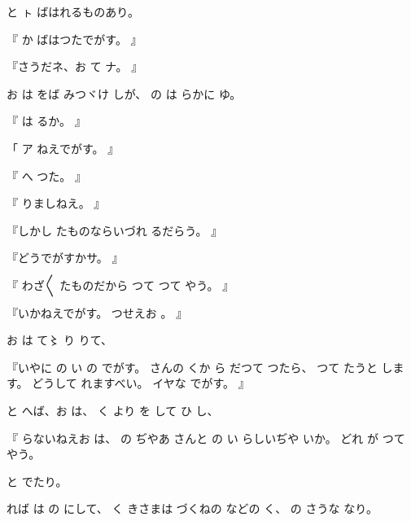 と
ㇳ
ばはれるものあり。

『
か
ばはつたでがす。
』

『さうだネ、お
て
ナ。
』

お
は
をば
みつヾけ
しが、
の
は
らかに
ゆ。

『
は
るか。
』

「
ア
ねえでがす。
』

『
へ
つた。
』

『
りましねえ。
』

『しかし
たものならいづれ
るだらう。
』

『どうでがすかサ。
』

『
わざ〳〵
たものだから
つて
つて
やう。
』

『いかねえでがす。
つせえお
。
』

お
は
て〻
り
りて、

『いやに
の
い
の
でがす。
さんの
くか
ら
だつて
つたら、
つて
たうと
します。
どうして
れますべい。
イヤな
でがす。
』

と
へば、お
は、
く
より
を
して
ひ
し、

『
らないねえお
は、
の
ぢやあ
さんと
の
い
らしいぢや
いか。
どれ
が
つて
やう。

と
でたり。

れば
は
の
にして、
く
きさまは
づくねの
などの
く、
の
さうな
なり。

